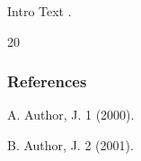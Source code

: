 \documentclass{beamer}
\begin{document}
\begin{frame}{Intro}
Text \cite{a,b}.
\end{frame}
\begin{thebibliography}{20}

\begin{frame}[allowframebreaks]
\frametitle{References}

 A. Author, J. 1 (2000).

 B. Author, J. 2 (2001).
\end{frame}
\end{thebibliography}
\end{document}
